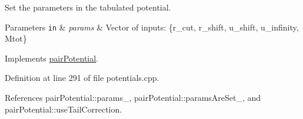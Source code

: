 Set the parameters in the tabulated potential. 


\begin{DoxyParams}[1]{Parameters}
\mbox{\tt in}  & {\em params} & Vector of inputs\-: \{r\-\_\-cut, r\-\_\-shift, u\-\_\-shift, u\-\_\-infinity, Mtot\} \\
\hline
\end{DoxyParams}


Implements \hyperlink{classpair_potential_ad4b237646f9de2ae9f95cc9350564bc5}{pair\-Potential}.



Definition at line 291 of file potentials.\-cpp.



References pair\-Potential\-::params\-\_\-, pair\-Potential\-::params\-Are\-Set\-\_\-, and pair\-Potential\-::use\-Tail\-Correction.



